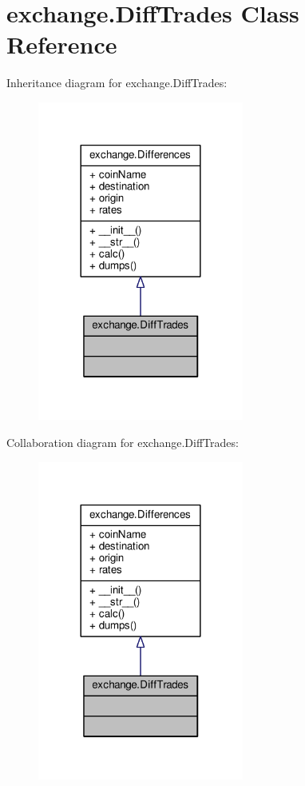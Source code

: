 \hypertarget{classexchange_1_1_diff_trades}{}\section{exchange.\+Diff\+Trades Class Reference}
\label{classexchange_1_1_diff_trades}


Inheritance diagram for exchange.\+Diff\+Trades\+:\nopagebreak
\begin{figure}[H]
\begin{center}
\leavevmode
\includegraphics[width=192pt]{classexchange_1_1_diff_trades__inherit__graph}
\end{center}
\end{figure}


Collaboration diagram for exchange.\+Diff\+Trades\+:\nopagebreak
\begin{figure}[H]
\begin{center}
\leavevmode
\includegraphics[width=192pt]{classexchange_1_1_diff_trades__coll__graph}
\end{center}
\end{figure}
